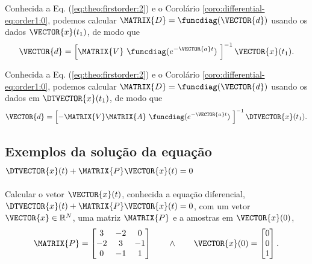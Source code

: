\begin{corollary}
\label{coro:differential-eq:order1:1}
Conhecida a Eq. (\ref{eq:theo:firstorder:2}) e o Corolário \ref{coro:differential-eq:order1:0},
podemos calcular
$\MATRIX{D}=\funcdiag(\VECTOR{d})$ 
usando os dados $\VECTOR{x}(t_1)$, de modo que
\begin{equation}\label{eq:coro:differential-eq:order1:1:a}
\VECTOR{d} =
\left[ \MATRIX{V}~\funcdiag(e^{-\VECTOR{a}t})~ \right]^{-1}
\VECTOR{x}(t_1).
\end{equation}
\end{corollary}

\begin{corollary}
\label{coro:differential-eq:order1:2}
Conhecida a Eq. (\ref{eq:theo:firstorder:2}) e o Corolário \ref{coro:differential-eq:order1:0},
podemos calcular
$\MATRIX{D}=\funcdiag(\VECTOR{d})$ 
usando os dados em $\DTVECTOR{x}(t_1)$, de modo que
\begin{equation}\label{eq:coro:differential-eq:order1:1:b}
\VECTOR{d} =
\left[ -\MATRIX{V}\MATRIX{A}~\funcdiag(e^{-\VECTOR{a}t})~ \right]^{-1}
\DTVECTOR{x}(t_1).
\end{equation}
\end{corollary}

\subsection{Exemplos da solução da equação $\DTVECTOR{x}(t) + \MATRIX{P} \VECTOR{x}(t)=0$}

\begin{example}
\label{ex:dxPx:0}
Calcular o vetor $\VECTOR{x}(t)$,
conhecida a equação diferencial, $\DTVECTOR{x}(t) + \MATRIX{P} \VECTOR{x}(t)=0$, com 
um vetor $\VECTOR{x} \in \mathbb{R}^{N}$, uma matriz $\MATRIX{P}$ e a amostras em $\VECTOR{x}(0)$,
\begin{equation}
\MATRIX{P}=
\begin{bmatrix}
3 & -2 & 0\\
-2 & 3 & -1\\
0 & -1 & 1
\end{bmatrix}
\qquad \wedge \qquad
\VECTOR{x}(0)=
\begin{bmatrix}
0\\
0\\
1
\end{bmatrix}.
\end{equation}
\end{example}



